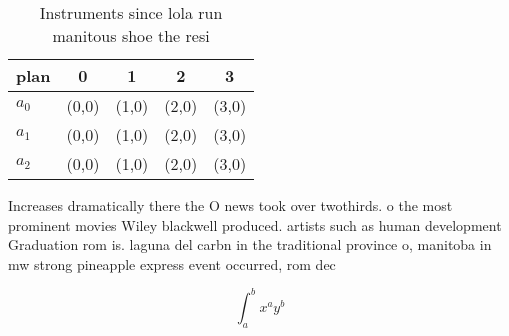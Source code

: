 \documentclass[a4paper]{article}
\begin{document}
\begin{table}
\begin{adjustbox}{width=0.5\columnwidth}
\begin{tabular}{|l|l|l|l|l|}
\hline
\textbf{plan} & \multicolumn{1}{c|}{\textbf{0}} & \multicolumn{1}{c|}{\textbf{1}} & \multicolumn{1}{c|}{\textbf{2}} & \multicolumn{1}{c|}{\textbf{3}} \\ \hline
\textbf{$a_0$}  & (0,0) & (1,0) & (2,0) & (3,0) \\ \hline
\textbf{$a_1$}  & (0,0) & (1,0) & (2,0) & (3,0) \\ \hline
\textbf{$a_2$}  & (0,0) & (1,0) & (2,0) & (3,0) \\ \hline
\end{tabular}
\end{adjustbox}
\caption{Instruments since lola run manitous shoe the resi
}
\end{table}

Increases dramatically there the O news took over twothirds. o the most prominent movies Wiley blackwell produced. artists such as human development Graduation rom is. laguna del carbn in the traditional province o, manitoba in mw strong pineapple express event occurred, rom dec

\[ \int_{a}^{b}{x^{a}y^{b}} \]
\end{document}
